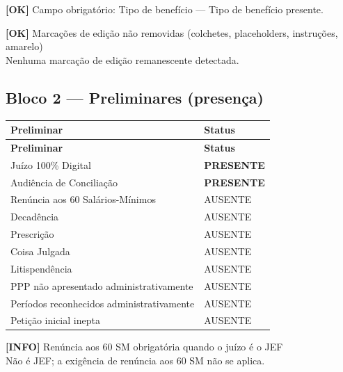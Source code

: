 \documentclass[12pt,a4paper]{article}
\newcommand{\statusOK}[1]{\textcolor{corOK}{\textbf{[OK]}} #1}
\newcommand{\statusINFO}[1]{\textcolor{corINFO}{\textbf{[INFO]}} #1}
\begin{document}
\medskip
\statusOK{Campo obrigatório: Tipo de benefício} --- Tipo de benefício presente.

\medskip
\statusOK{Marcações de edição não removidas (colchetes, placeholders, instruções, amarelo)}\\
Nenhuma marcação de edição remanescente detectada.

\subsection{Bloco 2 --- Preliminares (presença)}

\begin{longtable}{p{8.5cm} p{4.5cm}}
  \toprule
  \textbf{Preliminar} & \textbf{Status} \\
  \midrule
  \endfirsthead
  \toprule
  \textbf{Preliminar} & \textbf{Status} \\
  \midrule
  \endhead
  Juízo 100\% Digital                           & \textcolor{corOK}{\textbf{PRESENTE}} \\
  Audiência de Conciliação                      & \textcolor{corOK}{\textbf{PRESENTE}} \\
  Renúncia aos 60 Salários-Mínimos              & AUSENTE \\
  Decadência                                    & AUSENTE \\
  Prescrição                                    & AUSENTE \\
  Coisa Julgada                                 & AUSENTE \\
  Litispendência                                & AUSENTE \\
  PPP não apresentado administrativamente       & AUSENTE \\
  Períodos reconhecidos administrativamente     & AUSENTE \\
  Petição inicial inepta                        & AUSENTE \\
  \bottomrule
\end{longtable}

\statusINFO{Renúncia aos 60 SM obrigatória quando o juízo é o JEF}\\
Não é JEF; a exigência de renúncia aos 60 SM não se aplica.

\end{document}
